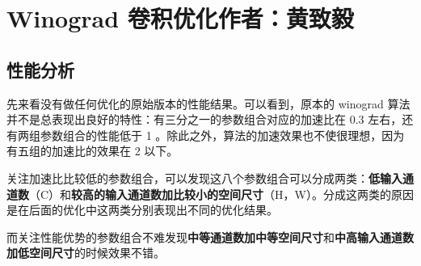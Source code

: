 \documentclass[a4paper,12pt,scheme=plain]{ctexart}
\numberwithin{equation}{section} %
\begin{document}


\tableofcontents
\newpage

\songti

\section[Winograd 卷积优化]{Winograd 卷积优化\hfill\textnormal{\small \color{gray}作者：黄致毅}}

\subsection{性能分析}
先来看没有做任何优化的原始版本的性能结果。可以看到，原本的 winograd 算法并不是总表现出良好的特性：有三分之一的参数组合对应的加速比在 0.3 左右，还有两组参数组合的性能低于 1 。除此之外，算法的加速效果也不使很理想，因为有五组的加速比的效果在 2 以下。

关注加速比比较低的参数组合，可以发现这八个参数组合可以分成两类：\textbf{低输入通道数}（C）和\textbf{较高的输入通道数加比较小的空间尺寸}（H，W）。分成这两类的原因是在后面的优化中这两类分别表现出不同的优化结果。

而关注性能优势的参数组合不难发现\textbf{中等通道数加中等空间尺寸}和\textbf{中高输入通道数加低空间尺寸}的时候效果不错。
\end{document}
